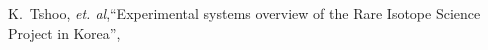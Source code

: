 \documentclass[11pt,a4paper]{article}
\begin{document}
\vspace*{0.5cm}
\begin{thebibliography}{9}   %

 K.~Tshoo, {\it et. al},``Experimental systems overview of the Rare Isotope Science Project in Korea'',

\end{thebibliography}
\end{document}
